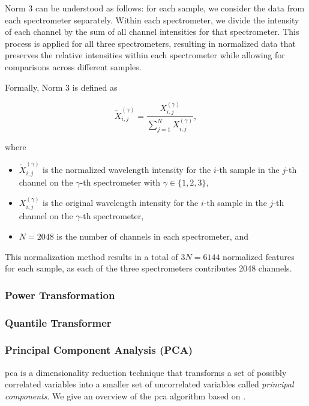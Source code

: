 Norm 3 can be understood as follows: for each sample, we consider the data from each spectrometer separately. Within each spectrometer, we divide the intensity of each channel by the sum of all channel intensities for that spectrometer. This process is applied for all three spectrometers, resulting in normalized data that preserves the relative intensities within each spectrometer while allowing for comparisons across different samples.

Formally, Norm 3 is defined as

\begin{equation}
	\tilde{X}_{i,j}^{(\gamma)} = \frac{X_{i,j}^{(\gamma)}}{\sum_{j=1}^{N} X_{i,j}^{(\gamma)}},
\end{equation}

where

\begin{itemize}
	\item $\tilde{X}_{i,j}^{(\gamma)}$ is the normalized wavelength intensity for the $i$-th sample in the $j$-th channel on the $\gamma$-th spectrometer with $\gamma \in \{1, 2, 3\}$,
	\item $X_{i,j}^{(\gamma)}$ is the original wavelength intensity for the $i$-th sample in the $j$-th channel on the $\gamma$-th spectrometer,
	\item $N = 2048$ is the number of channels in each spectrometer, and
\end{itemize}

This normalization method results in a total of $3N = 6144$ normalized features for each sample, as each of the three spectrometers contributes 2048 channels.

\subsubsection{Power Transformation}

\subsubsection{Quantile Transformer}

\subsubsection{Principal Component Analysis (PCA)}
\gls{pca} is a dimensionality reduction technique that transforms a set of possibly correlated variables into a smaller set of uncorrelated variables called \textit{principal components}.
We give an overview of the \gls{pca} algorithm based on \citet{James2023AnIS}.

